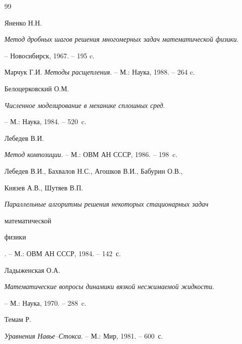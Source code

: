 \begin{thebibliography}{99}







Яненко Н.Н.


{\em Метод дробных шагов решения многомерных задач математической физики}.


-- Новосибирск, 1967. -- 195 c.







Марчук Г.И. {\em Методы расщепления}. -- М.: Наука, 1988. -- 264 c.







Белоцерковский О.М.


{\em Численное моделирование в механике сплошных сред}.


-- М.: Наука, 1984. -- 520~c.







Лебедев В.И.


{\em Метод композиции}. -- М.: ОВМ АН СССР, 1986. -- 198~c.







Лебедев В.И., Бахвалов Н.С., Агошков В.И., Бабурин О.В.,


Князев А.В., Шутяев В.П.


{\em Параллельные алгоритмы решения некоторых стационарных задач


математической


физики}. -- М.: ОВМ АН СССР, 1984. -- 142~с.







Ладыженская О.А.


{\em Математические вопросы динамики вязкой несжимаемой жидкости}.


-- М.: Наука, 1970. -- 288~c.







Темам Р.


{\em Уравнения Навье--Стокса}. -- М.: Мир, 1981. -- 600~с.






\end{thebibliography}
